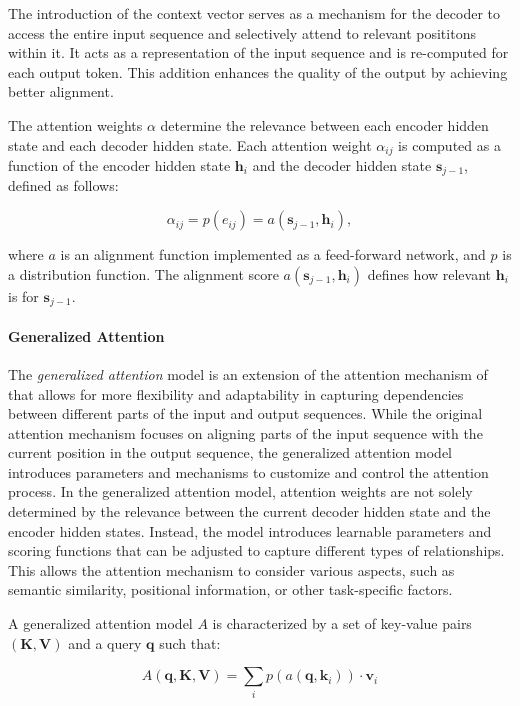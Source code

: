\noindent The introduction of the context vector serves as a mechanism for the decoder to access the entire input sequence and selectively attend to relevant posititons within it. It acts as a representation of the input sequence and is re-computed for each output token. This addition enhances the quality of the output by achieving better alignment.

The attention weights $\alpha$ determine the relevance between each encoder hidden state and each decoder hidden state. Each attention weight $\alpha_{ij}$ is computed as a function of the encoder hidden state $\bm{h}_i$ and the decoder hidden state $\bm{s}_{j-1}$, defined as follows:

\begin{equation}
    \alpha_{ij} = p(e_{ij}) = a(\bm{s}_{j-1}, \bm{h}_i),
\end{equation}

\noindent where $a$ is an alignment function implemented as a feed-forward network, and $p$ is a distribution function. The alignment score $a(\bm{s}_{j-1}, \bm{h}_i)$ defines how relevant $\bm{h}_i$ is for $\bm{s}_{j-1}$.

\paragraph{Generalized Attention} The \textit{generalized attention} model \citep{chaudhari2021attentive} is an extension of the attention mechanism of \citet{bahdanau2014neural} that allows for more flexibility and adaptability in capturing dependencies between different parts of the input and output sequences. While the original attention mechanism focuses on aligning parts of the input sequence with the current position in the output sequence, the generalized attention model introduces parameters and mechanisms to customize and control the attention process. In the generalized attention model, attention weights are not solely determined by the relevance between the current decoder hidden state and the encoder hidden states. Instead, the model introduces learnable parameters and scoring functions that can be adjusted to capture different types of relationships. This allows the attention mechanism to consider various aspects, such as semantic similarity, positional information, or other task-specific factors.

A generalized attention model $A$ is characterized by a set of key-value pairs $(\bm{K}, \bm{V})$ and a query $\bm{q}$ such that:

\begin{equation}
    A(\bm{q}, \bm{K}, \bm{V}) = \sum_i p(a(\bm{q}, \bm{k}_i)) \cdot \bm{v}_i
\end{equation}

